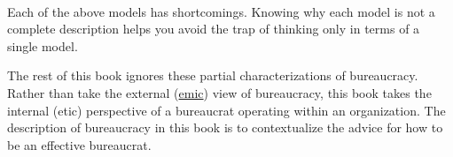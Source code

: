 \ \\

Each of the above models has shortcomings. Knowing why each model is not a complete description helps you avoid the trap of thinking only in terms of a single model. 

The rest of this book ignores these partial characterizations of bureaucracy. 
Rather than take the external (\href{https://en.wikipedia.org/wiki/Emic_and_etic}{emic}) view of bureaucracy, this book takes the internal (etic) perspective of a bureaucrat operating within an organization. 
The description of bureaucracy in this book is to contextualize the advice for how to be an effective bureaucrat. 